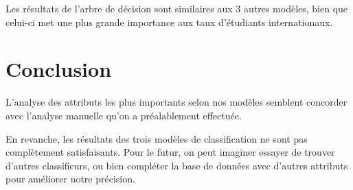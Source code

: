 \documentclass[twocolumns]{udes_rapport}
\begin{document}
        Les résultats de l'arbre de décision sont similaires aux 3 autres modèles, bien que celui-ci met une plus grande importance aux taux d'étudiants internationaux.

\section{Conclusion}\label{sec:conclusion}

L'analyse des attributs les plus importants selon nos modèles semblent concorder avec l'analyse manuelle qu'on a préalablement effectuée. 

En revanche, les résultats des trois modèles de classification ne sont pas complètement satisfaisants. Pour le futur, on peut imaginer essayer de trouver d'autres classifieurs, ou bien compléter la base de données avec d'autres attributs pour améliorer notre précision.

\newpage
\printbibliography
\end{document}
